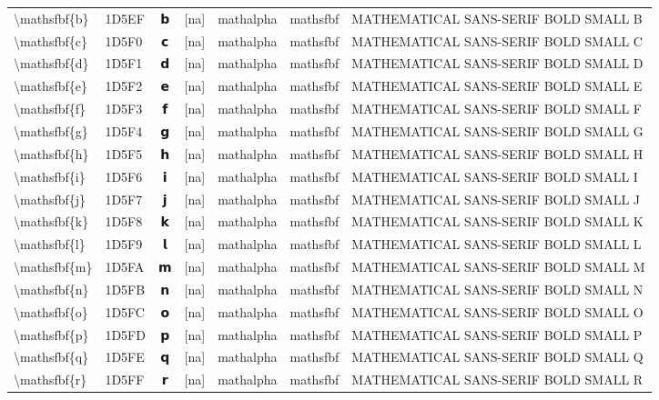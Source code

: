\documentclass[a4paper,landscape]{article}
\begin{document}
\begin{longtable}{llcclll}
\textbackslash{}mathsfbf\{b\} & 1D5EF & 𝗯 & [na] & mathalpha & mathsfbf & MATHEMATICAL SANS-SERIF BOLD SMALL B \\
\textbackslash{}mathsfbf\{c\} & 1D5F0 & 𝗰 & [na] & mathalpha & mathsfbf & MATHEMATICAL SANS-SERIF BOLD SMALL C \\
\textbackslash{}mathsfbf\{d\} & 1D5F1 & 𝗱 & [na] & mathalpha & mathsfbf & MATHEMATICAL SANS-SERIF BOLD SMALL D \\
\textbackslash{}mathsfbf\{e\} & 1D5F2 & 𝗲 & [na] & mathalpha & mathsfbf & MATHEMATICAL SANS-SERIF BOLD SMALL E \\
\textbackslash{}mathsfbf\{f\} & 1D5F3 & 𝗳 & [na] & mathalpha & mathsfbf & MATHEMATICAL SANS-SERIF BOLD SMALL F \\
\textbackslash{}mathsfbf\{g\} & 1D5F4 & 𝗴 & [na] & mathalpha & mathsfbf & MATHEMATICAL SANS-SERIF BOLD SMALL G \\
\textbackslash{}mathsfbf\{h\} & 1D5F5 & 𝗵 & [na] & mathalpha & mathsfbf & MATHEMATICAL SANS-SERIF BOLD SMALL H \\
\textbackslash{}mathsfbf\{i\} & 1D5F6 & 𝗶 & [na] & mathalpha & mathsfbf & MATHEMATICAL SANS-SERIF BOLD SMALL I \\
\textbackslash{}mathsfbf\{j\} & 1D5F7 & 𝗷 & [na] & mathalpha & mathsfbf & MATHEMATICAL SANS-SERIF BOLD SMALL J \\
\textbackslash{}mathsfbf\{k\} & 1D5F8 & 𝗸 & [na] & mathalpha & mathsfbf & MATHEMATICAL SANS-SERIF BOLD SMALL K \\
\textbackslash{}mathsfbf\{l\} & 1D5F9 & 𝗹 & [na] & mathalpha & mathsfbf & MATHEMATICAL SANS-SERIF BOLD SMALL L \\
\textbackslash{}mathsfbf\{m\} & 1D5FA & 𝗺 & [na] & mathalpha & mathsfbf & MATHEMATICAL SANS-SERIF BOLD SMALL M \\
\textbackslash{}mathsfbf\{n\} & 1D5FB & 𝗻 & [na] & mathalpha & mathsfbf & MATHEMATICAL SANS-SERIF BOLD SMALL N \\
\textbackslash{}mathsfbf\{o\} & 1D5FC & 𝗼 & [na] & mathalpha & mathsfbf & MATHEMATICAL SANS-SERIF BOLD SMALL O \\
\textbackslash{}mathsfbf\{p\} & 1D5FD & 𝗽 & [na] & mathalpha & mathsfbf & MATHEMATICAL SANS-SERIF BOLD SMALL P \\
\textbackslash{}mathsfbf\{q\} & 1D5FE & 𝗾 & [na] & mathalpha & mathsfbf & MATHEMATICAL SANS-SERIF BOLD SMALL Q \\
\textbackslash{}mathsfbf\{r\} & 1D5FF & 𝗿 & [na] & mathalpha & mathsfbf & MATHEMATICAL SANS-SERIF BOLD SMALL R \\

\end{longtable}
\end{document}
